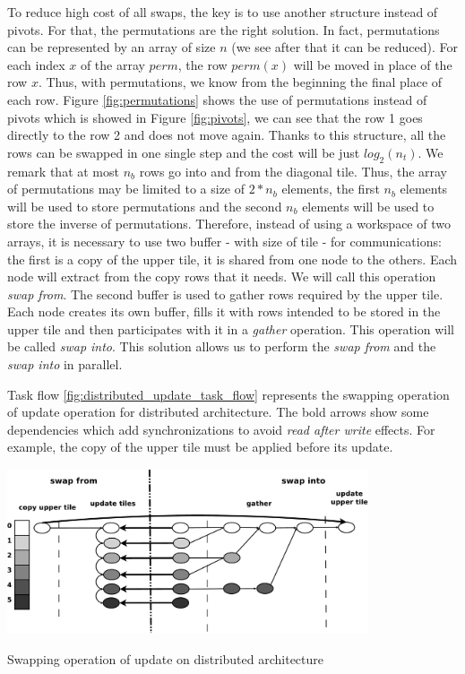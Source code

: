 To reduce high cost of all swaps, the key is to use another structure instead of pivots. For that, the permutations are the right solution. In fact, permutations can be represented by an array of size $n$ (we see after that it can be reduced). For each index $x$ of the array $perm$, the row $perm(x)$ will be moved in place of the row $x$. Thus, with permutations, we know from the beginning the final place of each row. 
Figure \ref{fig:permutations} shows the use of permutations instead of pivots which is showed in Figure \ref{fig:pivots}, we can see that the row 1 goes directly to the row 2 and does	 not move again.
Thanks to this structure, all the rows can be swapped in one single step and the cost will be just $log_2(n_t)$. 
We remark that at most $n_b$ rows go into and from the diagonal tile. Thus, the array of permutations may be limited to a size of $2*n_b$ elements, the first $n_b$ elements will be used to store permutations and the second $n_b$ elements will be used to store the inverse of permutations. Therefore, instead of using a workspace of two arrays, it is necessary to use two buffer - with size of tile - for communications: the first is a copy of the upper tile, it is shared from one node to the others. Each node will extract from the copy rows that it needs. We will call this operation \emph{swap from}. The second buffer is used to gather rows required by the upper tile. Each node creates its own buffer, fills it with rows intended to be stored in the upper tile and then participates with it in a \textit{gather} operation. This operation will be called \emph{swap into}. This solution allows us to perform the \emph{swap from} and the \emph{swap into} in parallel.

Task flow \ref{fig:distributed_update_task_flow} represents the swapping operation of update operation for distributed architecture. The bold arrows show some dependencies which add synchronizations to avoid \emph{read after write} effects. For example, the copy of the upper tile must be applied before its update.

\begin{taskflow}[!ht]
\centering
\includegraphics[width=0.8\textwidth]{figures/distributed_update_tf_bw.pdf}
\caption{Swapping operation of update on distributed architecture \label{fig:distributed_update_task_flow}}
\end{taskflow}

